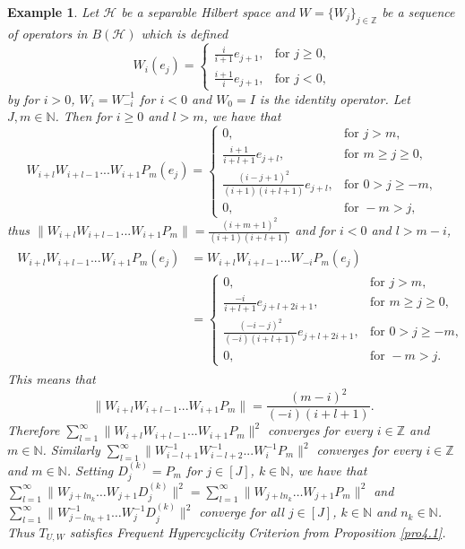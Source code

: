 \documentclass{article}
\newtheorem {example}[theorem]{Example}
\begin{document}
\begin{example}\textnormal{
Let $\mathcal{H}$ be a separable Hilbert space and $W=\{W_{j}\}_{j\in\mathbb{Z}}$ be a sequence of operators in $B(\mathcal{H})$ which is defined
\begin{displaymath}
W_{i}(e_{j})=\left\{ \begin{array}{ll}
\frac{i}{i+1}e_{j+1}, &  \textrm{for } j\geq 0,\\
\frac{i+1}{i}e_{j+1}, & \textrm{for } j< 0,
\end{array} \right.
\end{displaymath}
by for $i>0$, $W_{i}=W^{-1}_{-i}$ for $i<0$ and $W_{0}=I$ is the identity operator. Let $J, m\in \mathbb{N}$.
Then for $i\geq 0$ and $l>m$, we have that
\begin{displaymath}
W_{i+l}W_{i+l-1}...W_{i+1}P_{m}(e_{j})=\left\{ \begin{array}{ll}
0, & \textrm{for } j>m, \\
\frac{i+1}{i+l+1}e_{j+l}, &  \textrm{for } m\geq j\geq 0,\\
\frac{(i-j+1)^{2}}{(i+1)(i+l+1)}e_{j+l}, &  \textrm{for } 0> j\geq -m,\\
0, & \textrm{for } -m>j,
\end{array} \right.
\end{displaymath}
thus $\|W_{i+l}W_{i+l-1}...W_{i+1}P_{m}\|=\frac{(i+m+1)^{2}}{(i+1)(i+l+1)}$
and for $i<0$ and $l>m-i$,
\begin{eqnarray}\begin{split}\nonumber
W_{i+l}W_{i+l-1}...W_{i+1}P_{m}(e_{j})&=W_{i+l}W_{i+l-1}...W_{-i}P_{m}(e_{j})\\
&=\left\{ \begin{array}{ll}
0, & \textrm{for } j>m, \\
\frac{-i}{i+l+1}e_{j+l+2i+1}, &  \textrm{for } m\geq j\geq 0,\\
\frac{(-i-j)^{2}}{(-i)(i+l+1)}e_{j+l+2i+1}, &  \textrm{for } 0> j\geq -m,\\
0, & \textrm{for } -m>j.
\end{array} \right.
\end{split}\end{eqnarray}
This means that
\[\|W_{i+l}W_{i+l-1}...W_{i+1}P_{m}\|=\frac{(m-i)^{2}}{(-i)(i+l+1)}.\]
Therefore $\sum^{\infty}_{l=1}\|W_{i+l}W_{i+l-1}...W_{i+1}P_{m}\|^{2}$ converges for every $i\in\mathbb{Z}$ and $m\in \mathbb{N}$. Similarly $\sum^{\infty}_{l=1}\|W^{-1}_{i-l+1}W^{-1}_{i-l+2}...W^{-1}_{i}P_{m}\|^{2}$ converges for every $i\in\mathbb{Z}$ and $m\in \mathbb{N}$. Setting $D^{(k)}_{j}=P_{m}$ for $j\in[J]$, $k\in\mathbb{N}$, we have that
 $\sum^{\infty}_{l=1}\|W_{j+ln_{k}}\ldots W_{j+1}D^{(k)}_{j}\|^{2}
=\sum^{\infty}_{l=1}\|W_{j+ln_{k}}\ldots W_{j+1}P_{m}\|^{2}$ and $\sum^{\infty}_{l=1}\|W^{-1}_{j-ln_{k}+1}\ldots W^{-1}_{j}D^{(k)}_{j}\|^{2}$ converge for all $j\in[J]$, $k\in \mathbb{N}$ and $n_{k}\in \mathbb{N}$. Thus $T_{U,W}$ satisfies Frequent Hypercyclicity Criterion from Proposition \ref{pro4.1}.}


\end{example}
\end{document}
